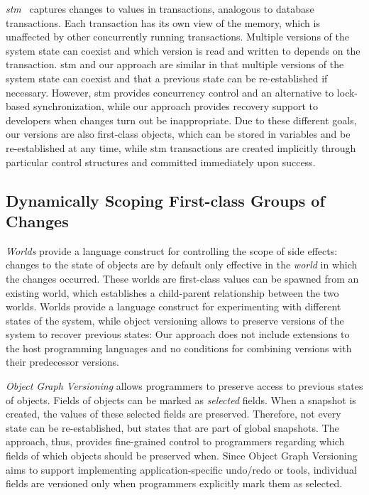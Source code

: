 \documentclass{sigplanconf}
\newcommand{\ac}[1]{\gls{#1}}
\newcommand{\Acp}[1]{\Gls{#1}}
\begin{document}
\emph{\Acp{stm}}~\cite{Shavit1995STM} captures changes to values in transactions, analogous to database transactions.
Each transaction has its own view of the memory, which is unaffected by other concurrently running transactions.
Multiple versions of the system state can coexist and which version is read and written to depends on the transaction.
\ac{stm} and our approach are similar in that multiple versions of the system state can coexist and that a previous state can be re-established if necessary.
However, \ac{stm} provides concurrency control and an alternative to lock-based synchronization, while our approach provides recovery support to developers when changes turn out be inappropriate.
Due to these different goals, our versions are also first-class objects, which can be stored in variables and be re-established at any time, while \ac{stm} transactions are created implicitly through particular control structures and committed immediately upon success.

\subsection{Dynamically Scoping First-class Groups of Changes}

\emph{Worlds}\cite{Warth2011Wor} provide a language construct for controlling the scope of side effects: changes to the state of objects are by default only effective in the \emph{world} in which the changes occurred.
These worlds are first-class values can be spawned from an existing world, which establishes a child-parent relationship between the two worlds.
Worlds provide a language construct for experimenting with different states of the system, while object versioning allows to preserve versions of the system to recover previous states: Our approach does not include extensions to the host programming languages and no conditions for combining versions with their predecessor versions.

\emph{Object Graph Versioning}\cite{Pluquet2009ECP} allows programmers to preserve access to previous states of objects.
Fields of objects can be marked as \emph{selected} fields.
When a snapshot is created, the values of these selected fields are preserved.
Therefore, not every state can be re-established, but states that are part of global snapshots. 
The approach, thus, provides fine-grained control to programmers regarding which fields of which objects should be preserved when.
Since Object Graph Versioning aims to support implementing application-specific undo/redo or tools, individual fields are versioned only when programmers explicitly mark them as selected.
\end{document}
